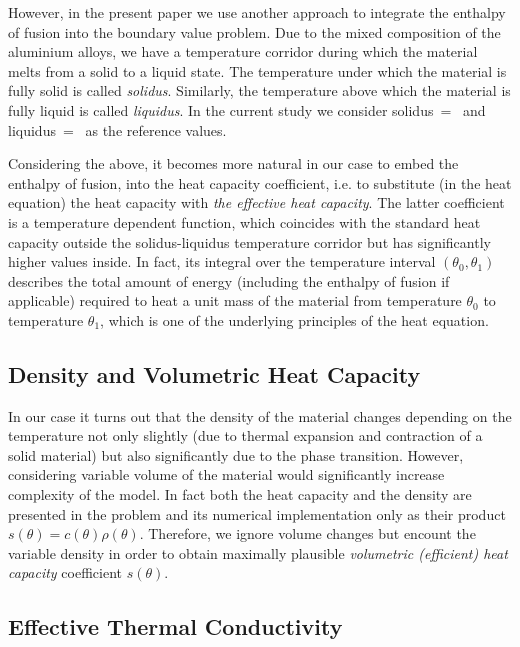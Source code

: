 However, in the present paper we use another approach to integrate the enthalpy of fusion into the boundary value problem. Due to the mixed composition of the aluminium alloys, we have a temperature corridor during which the material melts from a solid to a liquid state. The temperature under which the material is fully solid is called \emph{solidus}. Similarly, the temperature above which the material is fully liquid is called \emph{liquidus}. In the current study we consider solidus~=~ and liquidus~=~ as the reference values.

Considering the above, it becomes more natural in our case to embed the enthalpy of fusion, into the heat capacity coefficient, i.e. to substitute (in the heat equation) the heat capacity with \emph{the effective heat capacity}. The latter coefficient is a temperature dependent function, which coincides with the standard heat capacity outside the solidus-liquidus temperature corridor but has significantly higher values inside. In fact, its integral over the temperature interval $(\theta_0, \theta_1)$ describes the total amount of energy (including the enthalpy of fusion if applicable) required to heat a unit mass of the material from temperature $\theta_0$ to temperature $\theta_1$, which is one of the underlying principles of the heat equation.


\subsection{Density and Volumetric Heat Capacity}

In our case it turns out that the density of the material changes depending on the temperature not only slightly (due to thermal expansion and contraction of a solid material) but also significantly due to the phase transition. However, considering variable volume of the material would significantly increase complexity of the model. In fact both the heat capacity and the density are presented in the problem and its numerical implementation only as their product $s(\theta) = c(\theta) \rho(\theta)$. Therefore, we ignore volume changes but encount the variable density in order to obtain maximally plausible \emph{volumetric (efficient) heat capacity} coefficient $s(\theta)$.


\subsection{Effective Thermal Conductivity}

